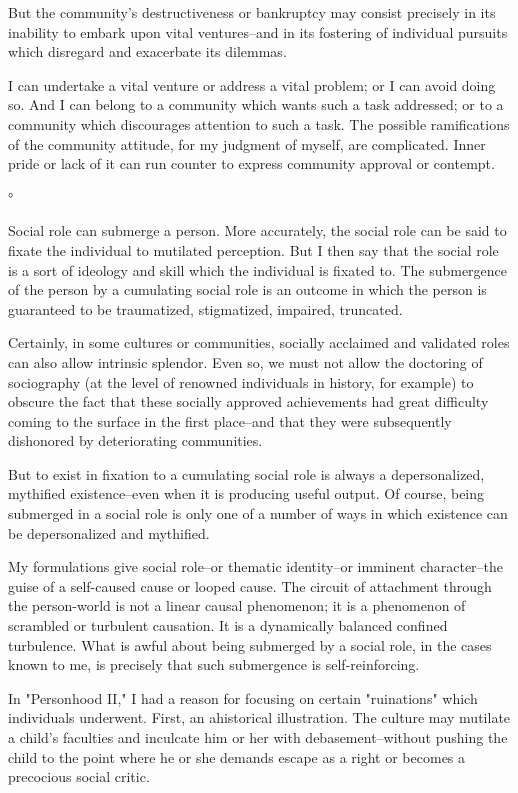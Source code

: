 \begin{enumerate}[label=\alph*.]
But the community's destructiveness or bankruptcy may consist precisely in its inability to embark upon vital ventures–and in its fostering of individual pursuits which disregard and exacerbate its dilemmas.

I can undertake a vital venture or address a vital problem; or I can avoid doing so. And I can belong to a community which wants such a task addressed; or to a community which discourages attention to such a task. The possible ramifications of the community attitude, for my judgment of myself, are complicated. Inner pride or lack of it can run counter to express community approval or contempt.

°

Social role can submerge a person. More accurately, the social role can be said to fixate the individual to mutilated perception. But I then say that the social role is a sort of ideology and skill which the individual is fixated to. The submergence of the person by a cumulating social role is an outcome in which the person is guaranteed to be traumatized, stigmatized, impaired, truncated.

Certainly, in some cultures or communities, socially acclaimed and validated roles can also allow intrinsic splendor. Even so, we must not allow the doctoring of sociography (at the level of renowned individuals in history, for example) to obscure the fact that these socially approved achievements had great difficulty coming to the surface in the first place–and that they were subsequently dishonored by deteriorating communities.

But to exist in fixation to a cumulating social role is always a depersonalized, mythified existence–even when it is producing useful output. Of course, being submerged in a social role is only one of a number of ways in which existence can be depersonalized and mythified.

My formulations give social role–or thematic identity–or imminent character–the guise of a self-caused cause or looped cause. The circuit of attachment through the person-world is not a linear causal phenomenon; it is a phenomenon of scrambled or turbulent causation. It is a dynamically balanced confined turbulence. What is awful about being submerged by a social role, in the cases known to me, is precisely that such submergence is self-reinforcing.

In "Personhood II," I had a reason for focusing on certain "ruinations" which individuals underwent. First, an ahistorical illustration. The culture may mutilate a child's faculties and inculcate him or her with debasement–without pushing the child to the point where he or she demands escape as a right or becomes a precocious social critic.


\end{enumerate}

